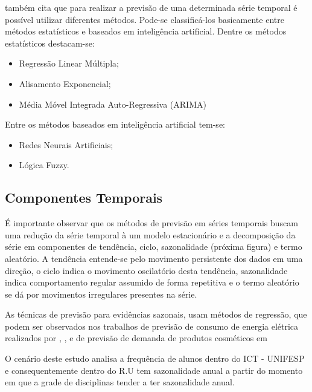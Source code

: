\documentclass[	12pt, Times, openright, twoside, a4paper, english, brazil]{abntex2}
\begin{document}
          \cite{Almeida2013} também cita que para realizar a previsão de uma determinada série temporal é possível utilizar diferentes métodos. Pode-se classificá-los basicamente entre métodos estatísticos e baseados em inteligência artificial.
          Dentre os métodos estatísticos destacam-se:
          \begin{itemize}
          \item Regressão Linear Múltipla;
          \item Alisamento Exponencial;
          \item Média Móvel Integrada Auto-Regressiva (ARIMA)
          \end{itemize}
          Entre os métodos baseados em inteligência artificial tem-se:
          \begin{itemize}
          \item Redes Neurais Artificiais;
          \item Lógica Fuzzy.
          \end{itemize}

        \subsection{Componentes Temporais}

          É importante observar que os métodos de previsão em séries temporais buscam uma redução da série temporal à um modelo estacionário e a decomposição da série em componentes de tendência, ciclo, sazonalidade (próxima figura) e termo aleatório. A tendência entende-se pelo movimento persistente dos dados em uma direção, o ciclo indica o movimento oscilatório desta tendência, sazonalidade indica comportamento regular assumido de forma repetitiva e o termo aleatório se dá por movimentos irregulares presentes na série.
           
          As técnicas de previsão para evidências sazonais, usam métodos de regressão, que podem ser observados nos trabalhos de previsão de consumo de energia elétrica realizados por \cite{Almeida2013}, \cite{RUAS2012}, \cite{Silva2010} e de previsão de demanda de produtos cosméticos em \cite{Junior2007}

          O cenário deste estudo analisa a frequência de alunos dentro do ICT - UNIFESP e consequentemente dentro do R.U tem sazonalidade anual a partir do momento em que a grade de disciplinas tender a ter sazonalidade anual. \\
\end{document}
